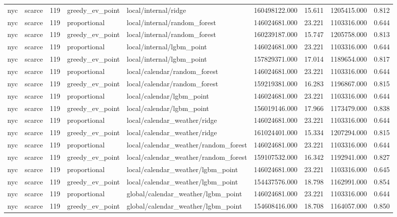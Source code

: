 \begin{tabular}{llrllrrrr}
nyc & scarce & 119 & greedy\_ev\_point & local/internal/ridge & 160498122.000 & 15.611 & 1205415.000 & 0.812 \\
nyc & scarce & 119 & proportional & local/internal/random\_forest & 146024681.000 & 23.221 & 1103316.000 & 0.644 \\
nyc & scarce & 119 & greedy\_ev\_point & local/internal/random\_forest & 160239187.000 & 15.747 & 1205758.000 & 0.813 \\
nyc & scarce & 119 & proportional & local/internal/lgbm\_point & 146024681.000 & 23.221 & 1103316.000 & 0.644 \\
nyc & scarce & 119 & greedy\_ev\_point & local/internal/lgbm\_point & 157829371.000 & 17.014 & 1189654.000 & 0.817 \\
nyc & scarce & 119 & proportional & local/calendar/random\_forest & 146024681.000 & 23.221 & 1103316.000 & 0.644 \\
nyc & scarce & 119 & greedy\_ev\_point & local/calendar/random\_forest & 159219381.000 & 16.283 & 1196867.000 & 0.815 \\
nyc & scarce & 119 & proportional & local/calendar/lgbm\_point & 146024681.000 & 23.221 & 1103316.000 & 0.644 \\
nyc & scarce & 119 & greedy\_ev\_point & local/calendar/lgbm\_point & 156019146.000 & 17.966 & 1173479.000 & 0.838 \\
nyc & scarce & 119 & proportional & local/calendar\_weather/ridge & 146024681.000 & 23.221 & 1103316.000 & 0.644 \\
nyc & scarce & 119 & greedy\_ev\_point & local/calendar\_weather/ridge & 161024401.000 & 15.334 & 1207294.000 & 0.815 \\
nyc & scarce & 119 & proportional & local/calendar\_weather/random\_forest & 146024681.000 & 23.221 & 1103316.000 & 0.644 \\
nyc & scarce & 119 & greedy\_ev\_point & local/calendar\_weather/random\_forest & 159107532.000 & 16.342 & 1192941.000 & 0.827 \\
nyc & scarce & 119 & proportional & local/calendar\_weather/lgbm\_point & 146024681.000 & 23.221 & 1103316.000 & 0.645 \\
nyc & scarce & 119 & greedy\_ev\_point & local/calendar\_weather/lgbm\_point & 154437576.000 & 18.798 & 1162991.000 & 0.854 \\
nyc & scarce & 119 & proportional & global/calendar\_weather/lgbm\_point & 146024681.000 & 23.221 & 1103316.000 & 0.644 \\
nyc & scarce & 119 & greedy\_ev\_point & global/calendar\_weather/lgbm\_point & 154608416.000 & 18.708 & 1164057.000 & 0.850 \\

\end{tabular}
